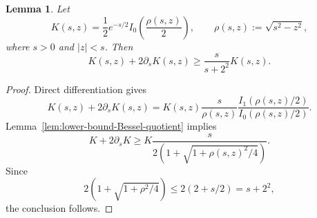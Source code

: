 \documentclass[11pt]{amsart}
\newtheorem{lemma}{Lemma}[section]
\theoremstyle{definition}
\theoremstyle{remark}
\numberwithin{equation}{section}
\begin{document}
\begin{lemma}
\label{lem:positive-kernel-combination}
Let
\[
K(s,z)=\frac12e^{-s/2}I_0\left(\frac{\rho(s,z)}2\right),
\qquad
\rho(s,z):=\sqrt{s^2-z^2},
\]
where $s>0$ and $|z|<s$. Then
\[
K(s,z)+2\partial_sK(s,z)
\geq
\frac{s}{s+2^2}K(s,z).
\]
\end{lemma}

\begin{proof}
Direct differentiation gives
\[
K(s,z)+2\partial_sK(s,z)
=
K(s,z)\frac{s}{\rho(s,z)}
\frac{I_1(\rho(s,z)/2)}{I_0(\rho(s,z)/2)}.
\]
Lemma~\ref{lem:lower-bound-Bessel-quotient} implies
\[
K+2\partial_sK
\geq
K\frac{s}{2\left(1+\sqrt{1+\rho(s,z)^2/4}\right)}.
\]
Since
\[
2\left(1+\sqrt{1+\rho^2/4}\right)
\leq2(2+s/2)=s+2^2,
\]
the conclusion follows.
\end{proof}
\end{document}
